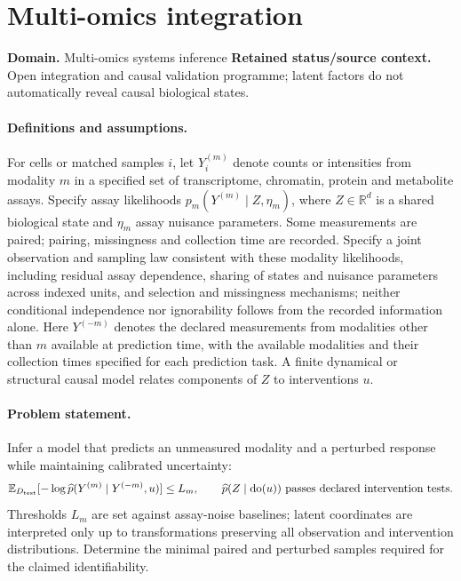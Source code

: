 \documentclass[11pt]{article}
\begin{document}
\section*{Multi-omics integration}
\label{prob:058}
\label{rank:128}
\par\smallskip

\noindent\textbf{Domain.} Multi-omics systems inference \quad \textbf{Retained status/source context.} Open integration and causal validation programme; latent factors do not automatically reveal causal biological states.
\paragraph{Definitions and assumptions.} For cells or matched samples $i$, let $Y_i^{(m)}$ denote counts or intensities from modality $m$ in a specified set of transcriptome, chromatin, protein and metabolite assays. Specify assay likelihoods $p_m(Y^{(m)}\mid Z,\eta_m)$, where $Z\in\mathbb{R}^d$ is a shared biological state and $\eta_m$ assay nuisance parameters. Some measurements are paired; pairing, missingness and collection time are recorded. Specify a joint observation and sampling law consistent with these modality likelihoods, including residual assay dependence, sharing of states and nuisance parameters across indexed units, and selection and missingness mechanisms; neither conditional independence nor ignorability follows from the recorded information alone. Here $Y^{(-m)}$ denotes the declared measurements from modalities other than $m$ available at prediction time, with the available modalities and their collection times specified for each prediction task. A finite dynamical or structural causal model relates components of $Z$ to interventions $u$.
\paragraph{Problem statement.} Infer a model that predicts an unmeasured modality and a perturbed response while maintaining calibrated uncertainty:
\[\mathbb{E}_{D_{\rm test}}[-\log\widehat p(Y^{(m)}\mid Y^{(-m)},u)]\le L_m,\qquad \widehat p(Z\mid\operatorname{do}(u))\ \text{passes declared intervention tests}.\]
Thresholds $L_m$ are set against assay-noise baselines; latent coordinates are interpreted only up to transformations preserving all observation and intervention distributions. Determine the minimal paired and perturbed samples required for the claimed identifiability.
\end{document}

